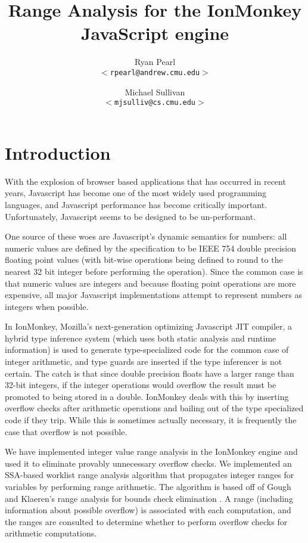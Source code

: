 \documentclass{article}
\begin{document}
\title{\bf Range Analysis for the IonMonkey JavaScript engine}

\author{
Ryan Pearl\\
\texttt{$<$rpearl@andrew.cmu.edu$>$}\\
\and
Michael Sullivan\\
\texttt{$<$mjsulliv@cs.cmu.edu$>$}\\
}

\maketitle

\section{Introduction}
With the explosion of browser based applications that has occurred in
recent years, Javascript has become one of the most widely used
programming languages, and Javascript performance has become
critically important. Unfortunately, Javascript seems to be designed
to be un-performant.

One source of these woes are Javascript's dynamic semantics for
numbers: all numeric values are defined by the specification to be
IEEE 754 double precision floating point values (with bit-wise
operations being defined to round to the nearest 32 bit integer before
performing the operation). Since the common case is that numeric
values are integers and because floating point operations are
more expensive, all major Javascript implementations attempt to
represent numbers as integers when possible.

In IonMonkey, Mozilla's next-generation optimizing Javascript JIT
compiler, a hybrid type inference system (which uses both static analysis and
runtime information\cite{BHackettTI}) is used to generate
type-specialized code for the common case of integer arithmetic, and
type guards are inserted if the type inferencer is not certain. The
catch is that since double precision floats have a larger range than
32-bit integers, if the integer operations would overflow the result
must be promoted to being stored in a double. IonMonkey deals with
this by inserting overflow checks after arithmetic operations and
bailing out of the type specialized code if they trip. While this is
sometimes actually necessary, it is frequently the case that overflow
is not possible.

We have implemented integer value range analysis in the IonMonkey
engine and used it to eliminate provably unnecessary overflow checks.
We implemented an SSA-based worklist range analysis algorithm that
propagates integer ranges for variables by performing range
arithmetic. The algorithm is based off of Gough and Klaeren's range
analysis for bounds check elimination
\cite{Gough94eliminatingrange}. A range (including information about
possible overflow) is associated with each computation, and the ranges
are consulted to determine whether to perform overflow checks for
arithmetic computations.
\end{document}
